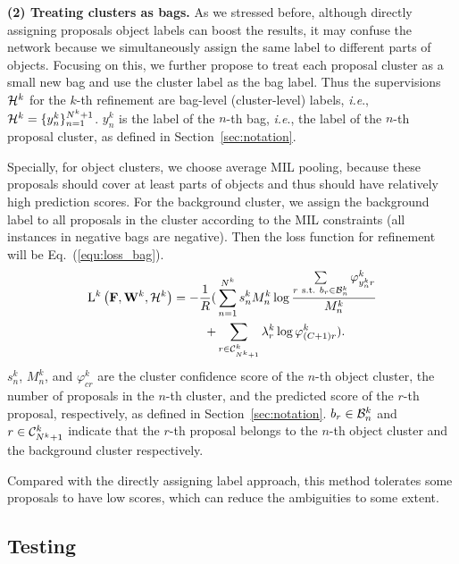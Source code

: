 \documentclass[10pt,journal,compsoc]{IEEEtran}
\def\ie{\emph{i.e}.} \def\Ie{\emph{I.e}.}
\begin{document}
\vspace{0.1cm}
\noindent\textbf{(2) Treating clusters as bags.}
As we stressed before,
although directly assigning proposals object labels can boost the results,
it may confuse the network because we simultaneously assign the same label to different parts of objects.
Focusing on this,
we further propose to treat each proposal cluster as a small new bag and use the cluster label as the bag label.
Thus the supervisions ${\cal H}^{k}$ for the $k$-th refinement are bag-level (cluster-level) labels,
\ie, ${\cal H}^{k} = \{y^{k}_{n}\}_{n=1}^{N^{k}+1}$.
$y^{k}_{n}$ is the label of the $n$-th bag, \ie, the label of the $n$-th proposal cluster,
as defined in Section~\ref{sec:notation}.

Specially, for object clusters,
we choose average MIL pooling,
because these proposals should cover at least parts of objects and thus should have relatively high prediction scores.
For the background cluster,
we assign the background label to all proposals in the cluster according to the MIL constraints
(all instances in negative bags are negative).
Then the loss function for refinement will be Eq.~(\ref{equ:loss_bag}).
\begin{equation}
\label{equ:loss_bag}
\begin{aligned}
   \mathrm{L}^{k}\left(\mathbf{F}, \mathbf{W}^{k}, {\cal H}^{k}\right) = -\frac{1}{R} (&\mathop{\sum} \limits_{n=1}^{N^{k}} s^{k}_{n} M_{n}^{k} \log \frac{\mathop{\sum} \limits_{r \ \textup{s.t.}\ b_{r} \in {\cal B}^{k}_{n}} \varphi^{k}_{y^{k}_{n}r}}{M_{n}^{k}}\\
   + &\mathop{\sum} \limits_{r \in {\cal C}^{k}_{N^{k} + 1}} \lambda^{k}_{r} \log \varphi^{k}_{(C+1)r}).
\end{aligned}
\end{equation}
$s^{k}_{n}$, $M_{n}^{k}$, and $\varphi^{k}_{cr}$ are the cluster confidence score of the $n$-th object cluster,
the number of proposals in the $n$-th cluster,
and the predicted score of the $r$-th proposal,
respectively,
as defined in Section~\ref{sec:notation}.
$b_{r} \in {\cal B}^{k}_{n}$ and $r \in {\cal C}^{k}_{N^{k}+1}$ indicate that
the $r$-th proposal belongs to the $n$-th object cluster
and the background cluster respectively.

Compared with the directly assigning label approach,
this method tolerates some proposals to have low scores, which can reduce the ambiguities to some extent.



\subsection{Testing}
\end{document}
